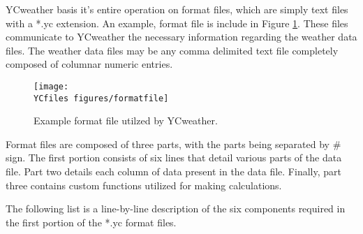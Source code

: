 \label{sec:formatfile}
YCweather basis it's entire operation on format files, which are simply text files with a *.yc extension.  An example, format file is include in Figure \ref{fig:formatfile}.  These files communicate to YCweather the necessary information regarding the weather data files.  The weather data files may be any comma delimited text file completely composed of columnar numeric entries.

\begin{figure}[h]\centering
	\texttt{[image: \\YCfiles figures/formatfile]}
	\caption{Example format file utilzed by YCweather.}
	\label{fig:formatfile}
\end{figure}

Format files are composed of three parts, with the parts being separated by \# sign.  The first portion consists of six lines that detail various parts of the data file.  Part two details each column of data present in the data file.  Finally, part three contains custom functions utilized for making calculations.

The following list is a line-by-line description of the six components required in the first portion of the *.yc format files.

